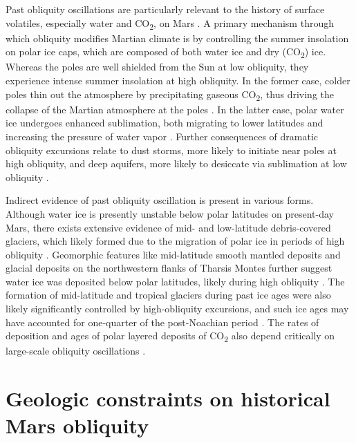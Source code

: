\documentclass{ucetd}
\begin{document}
Past obliquity oscillations are particularly relevant to the history of surface volatiles, especially water and CO\textsubscript{2}, on Mars \citep[reviewed in][]{jakosky2021a}. A primary mechanism through which obliquity modifies Martian climate is by controlling the summer insolation on polar ice caps, which are composed of both water ice and dry (CO\textsubscript{2}) ice. Whereas the poles are well shielded from the Sun at low obliquity, they experience intense summer insolation at high obliquity. In the former case, colder poles thin out the atmosphere by precipitating gaseous CO\textsubscript{2}, thus driving the collapse of the Martian atmosphere at the poles \citep{lindner1985a, kreslavsky2005a, phillips2011a, soto2015a}. In the latter case, polar water ice undergoes enhanced sublimation, both migrating to lower latitudes and increasing the pressure of water vapor \citep{haberle1990a, jakosky1995a, zent2013a, forget2017a}. Further consequences of dramatic obliquity excursions relate to dust storms, more likely to initiate near poles at high obliquity, and deep aquifers, more likely to desiccate via sublimation at low obliquity \citep{haberle2003a, grimm2017a}.

Indirect evidence of past obliquity oscillation is present in various forms. Although water ice is presently unstable below polar latitudes on present-day Mars, there exists extensive evidence of mid- and low-latitude debris-covered glaciers, which likely formed due to the migration of polar ice in periods of high obliquity \citep{head2003b, dickson2008a, adeli2019a}. Geomorphic features like mid-latitude smooth mantled deposits and glacial deposits on the northwestern flanks of Tharsis Montes further suggest water ice was deposited below polar latitudes, likely during high obliquity \citep{mustard2001a, head2003a, head2003b, milkovich2006a,  shean2007a}. The formation of mid-latitude and tropical glaciers during past ice ages were also likely significantly controlled by high-obliquity excursions, and such ice ages may have accounted for one-quarter of the post-Noachian period  \citep{forget2006a, madeleine2009a, weiss2019a}. The rates of deposition and ages of polar layered deposits of CO\textsubscript{2} also depend critically on large-scale obliquity oscillations \citep{manning2019a, emmett2020a}.

\section{Geologic constraints on historical Mars obliquity}
\label{section:1-4}
\end{document}
